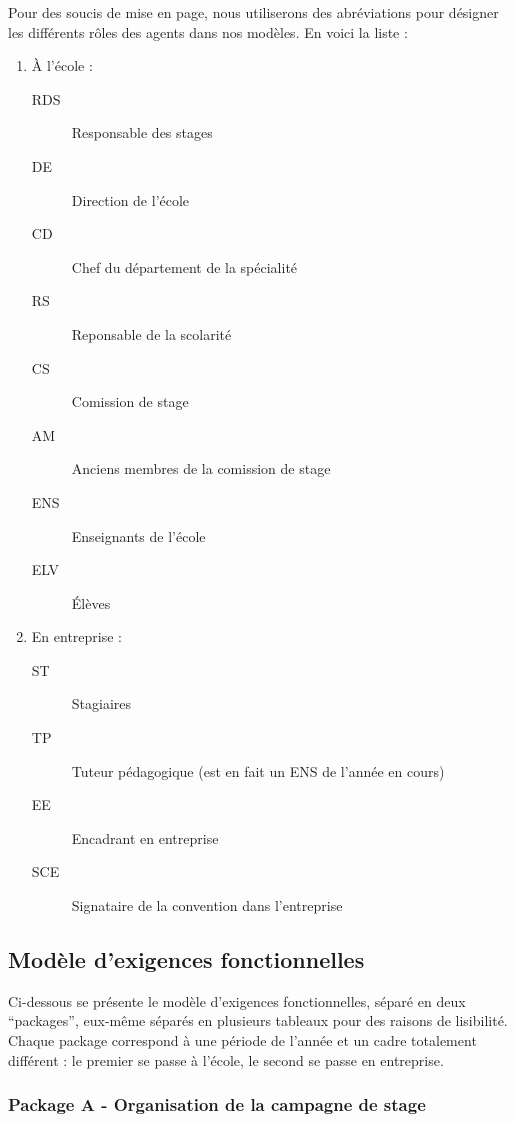\documentclass[12pt,a4paper]{article}
\begin{document}
Pour des soucis de mise en page, nous utiliserons des abréviations pour désigner
les différents rôles des agents dans nos modèles. En voici la liste :
\begin{enumerate}
    \item À l'école :
        \begin{description}
            \item[RDS] {Responsable des stages}
            \item[DE]  {Direction de l'école}
            \item[CD]  {Chef du département de la spécialité}
            \item[RS]  {Reponsable de la scolarité}
            \item[CS]  {Comission de stage}
            \item[AM]  {Anciens membres de la comission de stage}
            \item[ENS] {Enseignants de l'école}
            \item[ELV] {Élèves}
        \end{description}
    \item En entreprise :
        \begin{description}
            \item[ST]  {Stagiaires}
            \item[TP]  {Tuteur pédagogique (est en fait un ENS de l'année en cours)}
            \item[EE]  {Encadrant en entreprise}
            \item[SCE] {Signataire de la convention dans l'entreprise}
        \end{description}
\end{enumerate}

\subsection{Modèle d'exigences fonctionnelles}

Ci-dessous se présente le modèle d'exigences fonctionnelles, séparé en deux
\enquote{packages}, eux-même séparés en plusieurs tableaux pour des raisons de
lisibilité. Chaque package correspond à une période de l'année et un cadre
totalement différent : le premier se passe à l'école, le second se passe en
entreprise. 

\subsubsection{Package A - Organisation de la campagne de stage}
\end{document}
